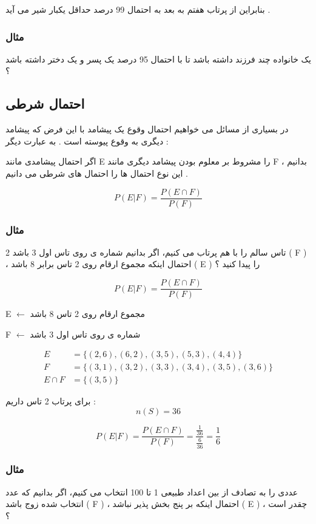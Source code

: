 \documentclass[12pt]{book}
\begin{document}
بنابراین از پرتاب هفتم به بعد به احتمال 99 درصد حداقل یکبار شیر می آید .

\newpage

\subsubsection{مثال}
یک خانواده چند فرزند داشته باشد تا با احتمال 95 درصد یک پسر و یک دختر داشته باشد ؟

\newpage


\subsection{احتمال شرطی}

در بسیاری از مسائل می خواهیم احتمال وقوع یک پیشامد با این فرض که پیشامد دیگری به وقوع پیوسته است . به عبارت دیگر :

اگر احتمال پیشامدی مانند E را مشروط بر معلوم بودن پیشامد دیگری مانند F بدانیم ، این نوع احتمال ها را احتمال های شرطی می دانیم .

$$
P( E | F ) = \frac{P( E \cap F )}{P(F)} 
$$


\subsubsection{مثال}
2 تاس سالم را با هم پرتاب می کنیم، اگر بدانیم شماره ی روی تاس اول 3 باشد ( F ) ، احتمال اینکه مجموع ارقام روی 2 تاس برابر 8 باشد ( E ) را پیدا کنید ؟

$$
P( E | F ) =  \frac{P( E \cap F )}{P(F)} 
$$

E $\leftarrow$ مجموع ارقام روی 2 تاس 8 باشد

F $\leftarrow$ شماره ی روی تاس اول 3 باشد

\begin{align*}
E &= \{ ( 2, 6 ), ( 6, 2 ), ( 3, 5 ), ( 5, 3 ), ( 4, 4 ) \} \\
F &= \{ ( 3, 1 ), ( 3, 2 ), ( 3, 3 ), ( 3, 4 ), ( 3, 5 ), ( 3, 6 ) \} \\
E \cap F &= \{ ( 3, 5 ) \}
\end{align*}

برای پرتاب 2 تاس داریم :
$$
n(S) = 36
$$

$$
P( E | F ) =  \frac{P( E \cap F )}{P(F)}  = \frac{\frac{1}{36}}{\frac{6}{36}}  = \frac{1}{6}
$$


\subsubsection{مثال}
عددی را به تصادف از بین اعداد طبیعی 1 تا 100 انتخاب می کنیم، اگر بدانیم که عدد انتخاب شده زوج باشد ( F ) ، احتمال اینکه بر پنج بخش پذیر نباشد ( E ) ، چقدر است ؟
\end{document}

